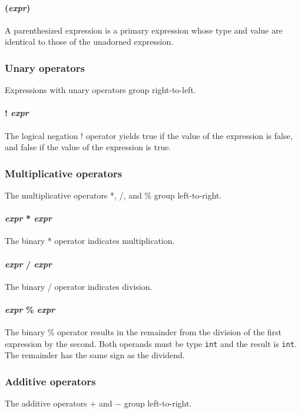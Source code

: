 \paragraph{(\textit{expr})}
A parenthesized expression is a primary expression whose type and value are identical to those of the unadorned expression. 

\subsubsection{Unary operators}
Expressions with unary operators group right-to-left.

\paragraph{! \textit{expr}}
The logical negation ! operator yields true if the value of the expression is false, and false if the value of the expression is true. 

\subsubsection{Multiplicative operators}
The multiplicative operators *, /, and \% group left-to-right.

\paragraph{\textit{expr} * \textit{expr}}
The binary * operator indicates multiplication.

\paragraph{\textit{expr} / \textit{expr}}
The binary / operator indicates division.

\paragraph{\textit{expr} \% \textit{expr}}
The  binary \% operator results in the remainder from the division of the first expression by the second. Both operands must be type \texttt{int} and the result is \texttt{int}. The remainder has the same sign as the dividend.
\\
\subsubsection{Additive operators}
The additive operators $+$ and $-$ group left-to-right.

